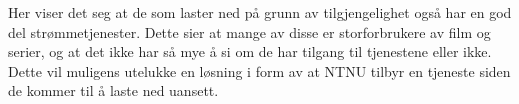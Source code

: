 Her viser det seg at de som laster ned på grunn av tilgjengelighet også har en god del strømmetjenester. Dette sier at mange av disse er storforbrukere av film og serier, og at det ikke har så mye å si om de har tilgang til tjenestene eller ikke. Dette vil muligens utelukke en løsning i form av at NTNU tilbyr en tjeneste siden de kommer til å laste ned uansett.


